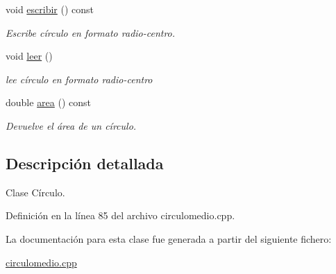 \begin{DoxyCompactItemize}
\mbox{\label{classCirculo_a33d4f94063db04f131a92587b77754de}} 
void \hyperlink{classCirculo_a33d4f94063db04f131a92587b77754de}{escribir} () const
\begin{DoxyCompactList}\small\item\em Escribe círculo en formato radio-\/centro. \end{DoxyCompactList}\item 
\mbox{\label{classCirculo_aa71efffb3b42eeaefd43743a8d34aa74}} 
void \hyperlink{classCirculo_aa71efffb3b42eeaefd43743a8d34aa74}{leer} ()
\begin{DoxyCompactList}\small\item\em lee círculo en formato radio-\/centro \end{DoxyCompactList}\item 
\mbox{\label{classCirculo_ace56d5b2475054080c3a2bf54fd33271}} 
double \hyperlink{classCirculo_ace56d5b2475054080c3a2bf54fd33271}{area} () const
\begin{DoxyCompactList}\small\item\em Devuelve el área de un círculo. \end{DoxyCompactList}\end{DoxyCompactItemize}


\subsection{Descripción detallada}
Clase Círculo. 

Definición en la línea 85 del archivo circulomedio.\+cpp.



La documentación para esta clase fue generada a partir del siguiente fichero\+:\begin{DoxyCompactItemize}
\item 
\hyperlink{circulomedio_8cpp}{circulomedio.\+cpp}\end{DoxyCompactItemize}
